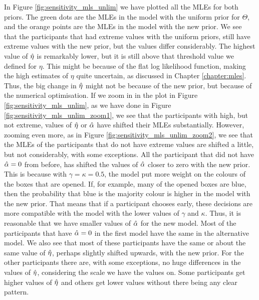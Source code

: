 In Figure \ref{fig:sensitivity_mls_unlim} we have plotted all the MLEs for both priors. The green dots are the MLEs in the model with the uniform prior for $\Theta$, and the orange points are the MLEs in the model with the new prior.
We see that the participants that had extreme values with the uniform priors, still have extreme values with the new prior, but the values differ considerably. The highest value of $\hat{\eta}$ is remarkably lower, but it is still above that threshold value we defined for $\eta$. This might be because of the flat log likelihood function, making the high estimates of $\eta$ quite uncertain, as discussed in Chapter \ref{chapter:mles}. Thus, the big change in $\hat{\eta}$ might not be because of the new prior, but because of the numerical optimisation. 
If we zoom in in the plot in Figure \ref{fig:sensitivity_mls_unlim}, as we have done in Figure \ref{fig:sensitivity_mls_unlim_zoom1}, we see that the participants with high, but not extreme, values of $\hat{\eta}$ or $\hat{\alpha}$ have shifted their MLEs substantially. 
However, zooming even more, as in Figure \ref{fig:sensitivity_mls_unlim_zoom2}, we see that the MLEs of the participants that do not have extreme values are shifted a little, but not considerably, with some exceptions. All the participant that did not have $\hat{\alpha}=0$ from before, has shifted the values of $\hat{\alpha}$ closer to zero with the new prior. 
This is because with $\gamma=\kappa=0.5$, the model put more weight on the colours of the boxes that are opened. If, for example, many of the opened boxes are blue, then the probability that blue is the majority colour is higher in the model with the new prior. That means that if a participant chooses early, these decisions are more compatible with the model with the lower values of $\gamma$  and $\kappa$. 
Thus, it is reasonable that we have smaller values of $\hat{\alpha}$ for the new model. 
Most of the participants that have $\hat{\alpha}=0$ in the first model have the same in the alternative model. We also see that most of these participants have the same or about the same value of $\hat{\eta}$, perhaps slightly shifted upwards, with the new prior. For the other participants there are, with some exceptions, no huge differences in the values of $\hat{\eta}$, considering the scale we have the values on. Some participants get higher values of $\hat{\eta}$ and others get lower values without there being any clear pattern. 
